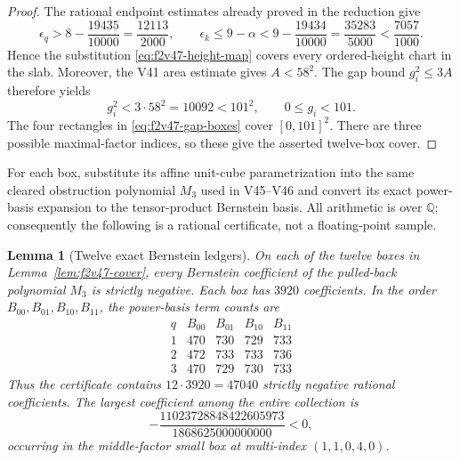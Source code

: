 \documentclass[11pt]{article}
\newtheorem{lemma}[theorem]{Lemma}
\theoremstyle{definition}
\theoremstyle{remark}
\begin{document}
\begin{proof}
The rational endpoint estimates already proved in the reduction give
\begin{equation}
 \epsilon_q>8-\frac{19435}{10000}=\frac{12113}{2000},
 \qquad
 \epsilon_k\leq9-\alpha
   <9-\frac{19434}{10000}=\frac{35283}{5000}
   <\frac{7057}{1000}.
 \label{eq:f2v47-height-cover}
\end{equation}
Hence the substitution \eqref{eq:f2v47-height-map} covers every ordered-height
chart in the slab.  Moreover, the V41 area estimate gives \(A<58^2\).  The gap
bound \(g_i^2\leq3A\) therefore yields
\begin{equation}
  g_i^2<3\cdot58^2=10092<101^2,
  \qquad 0\leq g_i<101.
 \label{eq:f2v47-gap-cover}
\end{equation}
The four rectangles in \eqref{eq:f2v47-gap-boxes} cover \([0,101]^2\).
There are three possible maximal-factor indices, so these give the asserted
twelve-box cover.
\end{proof}

For each box, substitute its affine unit-cube parametrization into the same
cleared obstruction polynomial \(M_3\) used in V45--V46 and convert its exact
power-basis expansion to the tensor-product Bernstein basis.  All arithmetic is
over \(\mathbb Q\); consequently the following is a rational certificate, not a
floating-point sample.

\begin{lemma}[Twelve exact Bernstein ledgers]
\label{lem:f2v47-ledgers}
On each of the twelve boxes in Lemma~\ref{lem:f2v47-cover}, every Bernstein
coefficient of the pulled-back polynomial \(M_3\) is strictly negative.
Each box has \(3920\) coefficients.  In the order
\(B_{00},B_{01},B_{10},B_{11}\), the power-basis term counts are
\begin{equation}
 \begin{array}{c|rrrr}
 q& B_{00}&B_{01}&B_{10}&B_{11}\\ \hline
 1&470&730&729&733\\
 2&472&733&733&736\\
 3&470&729&730&733
 \end{array}
 \label{eq:f2v47-term-ledger}
\end{equation}
Thus the certificate contains \(12\cdot3920=47040\) strictly negative rational
coefficients.  The largest coefficient among the entire collection is
\begin{equation}
 -\frac{11023728848422605973}{1868625000000000}<0,
 \label{eq:f2v47-global-margin}
\end{equation}
occurring in the middle-factor small box at multi-index
\((1,1,0,4,0)\).
\end{lemma}
\end{document}
